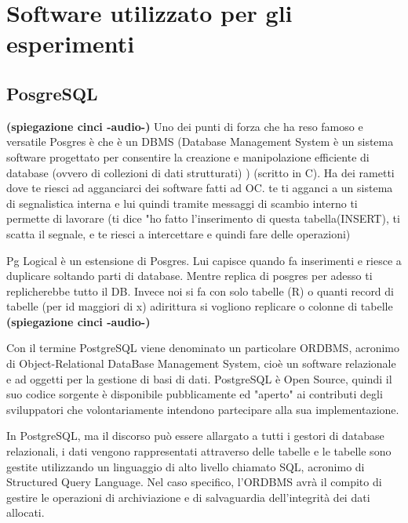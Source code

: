\section{Software utilizzato per gli esperimenti}
\subsection{PosgreSQL}

\textbf{(spiegazione cinci -audio-)}
Uno dei punti di forza che ha reso famoso e versatile Posgres è che è un DBMS (Database Management System è un sistema software progettato per consentire la creazione e manipolazione efficiente di database (ovvero di collezioni di dati strutturati) ) (scritto in C). Ha dei rametti dove te riesci ad agganciarci dei software fatti ad OC. te ti agganci a un sistema di segnalistica interna e lui quindi tramite messaggi di scambio interno ti permette di lavorare (ti dice "ho fatto l'inserimento di questa tabella(INSERT), ti scatta il segnale, e te riesci a intercettare e quindi fare delle operazioni)

Pg Logical è un estensione di Posgres. Lui capisce quando fa inserimenti e riesce a duplicare soltando parti di database. Mentre replica di posgres per adesso ti replicherebbe tutto il DB. Invece noi si fa con solo tabelle (R) o quanti record di tabelle (per id maggiori di x) adirittura si vogliono replicare o colonne di tabelle \\
\textbf{(spiegazione cinci -audio-)}


Con il termine PostgreSQL viene denominato un particolare ORDBMS, acronimo di Object-Relational DataBase Management System, cioè un software relazionale e ad oggetti per la gestione di basi di dati.
PostgreSQL è Open Source, quindi il suo codice sorgente è disponibile pubblicamente ed "aperto" ai contributi degli sviluppatori che volontariamente intendono partecipare alla sua implementazione.

In PostgreSQL, ma il discorso può essere allargato a tutti i gestori di database relazionali, i dati vengono rappresentati attraverso delle tabelle e le tabelle sono gestite utilizzando un linguaggio di alto livello chiamato SQL, acronimo di Structured Query Language.
Nel caso specifico, l'ORDBMS avrà il compito di gestire le operazioni di archiviazione e di salvaguardia dell'integrità dei dati allocati.

